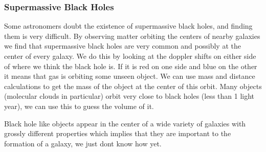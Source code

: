 \documentclass[12pt]{article}
\begin{document}
\subsubsection{Supermassive Black Holes}
Some astronomers doubt the existence of supermassive black holes, and finding them is very difficult. By observing matter orbiting the centers of nearby galaxies we find that supermassive black holes are very common and possibly at the center of every galaxy. We do this by looking at the doppler shifts on either side of where we think the black hole is. If it is red on one side and blue on the other it means that gas is orbiting some unseen object. We can use mass and distance calculations to get the mass of the object at the center of this orbit. Many objects (molecular clouds in particular) orbit very close to black holes (less than 1 light year), we can use this to guess the volume of it.

Black hole like objects appear in the center of a wide variety of galaxies with grossly different properties which implies that they are important to the formation of a galaxy, we just dont know how yet.
\end{document}
